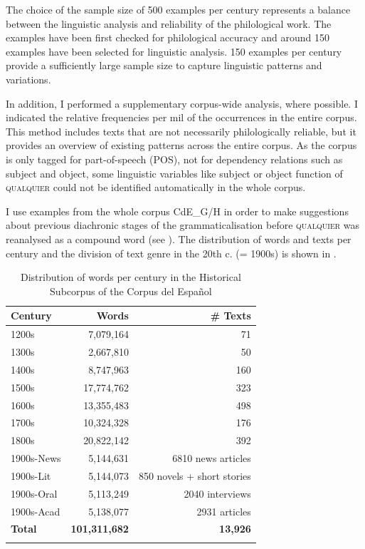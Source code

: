 The choice of the sample size of 500 examples per century represents a balance between the linguistic analysis and reliability of the philological work. The examples have been first checked for philological accuracy and around 150 examples have been selected for linguistic analysis. 150 examples per century provide a sufficiently large sample size to capture linguistic patterns and variations.

In addition, I performed a supplementary corpus-wide analysis, where possible. I indicated the relative frequencies per mil of the occurrences in the entire corpus. This method includes texts that are not necessarily philologically reliable, but it provides an overview of existing patterns across the entire corpus. As the corpus is only tagged for part-of-speech (POS), not for dependency relations such as subject and object, some linguistic variables like subject or object function of \textsc{qualquier} could not be identified automatically in the whole corpus.

I use examples from the whole corpus CdE\_G/H in order to make suggestions about previous diachronic stages of the grammaticalisation before \textsc{qualquier} was reanalysed as a compound word (see ).
The distribution of words and texts per century and the division of text genre in the 20th c. (= 1900s) is shown in .


\begin{table}
\begin{tabularx}{.8\textwidth}{Xrr}
\lsptoprule
\textbf{Century} & \textbf{Words} & \textbf{\# Texts} \\
\midrule 1200s & 7,079,164 & 71\\
1300s & 2,667,810 & 50\\
1400s & 8,747,963 & 160\\
1500s & 17,774,762 & 323\\
1600s & 13,355,483 & 498\\
1700s & 10,324,328 & 176\\
1800s & 20,822,142 & 392\\
1900s-News & 5,144,631 & 6810 news articles \\
1900s-Lit & 5,144,073 & 850 novels + short stories\\
1900s-Oral & 5,113,249 & 2040 interviews \\
1900s-Acad & 5,138,077 & 2931 articles\\
\midrule \textbf{Total} & \textbf{101,311,682} & \textbf{13,926} \\
\lspbottomrule
\end{tabularx}
\caption{Distribution of words per century in the Historical Subcorpus of the Corpus del Español}
\label{tab:words_per_century}
\end{table}

